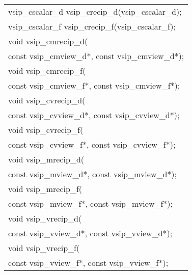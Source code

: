 \\\cvsiplh
\afh
\\\hspace*{.04\textwidth} {
\ttfamily
\begin{tabular}[H]{l}
vsip\_cscalar\_d vsip\_crecip\_d(vsip\_cscalar\_d);\\
vsip\_cscalar\_f vsip\_crecip\_f(vsip\_cscalar\_f);\\
void vsip\_cmrecip\_d(\\*\hspace{.6cm}const vsip\_cmview\_d*, const vsip\_cmview\_d*);\\
void vsip\_cmrecip\_f(\\*\hspace{.6cm}const vsip\_cmview\_f*, const vsip\_cmview\_f*);\\
void vsip\_cvrecip\_d(\\*\hspace{.6cm}const vsip\_cvview\_d*, const vsip\_cvview\_d*);\\
void vsip\_cvrecip\_f(\\*\hspace{.6cm}const vsip\_cvview\_f*, const vsip\_cvview\_f*);\\
void vsip\_mrecip\_d(\\*\hspace{.6cm}const vsip\_mview\_d*, const vsip\_mview\_d*);\\
void vsip\_mrecip\_f(\\*\hspace{.6cm}const vsip\_mview\_f*, const vsip\_mview\_f*);\\
void vsip\_vrecip\_d(\\*\hspace{.6cm}const vsip\_vview\_d*, const vsip\_vview\_d*);\\
void vsip\_vrecip\_f(\\*\hspace{.6cm}const vsip\_vview\_f*, const vsip\_vview\_f*);\\
\end{tabular}
}
\\\pyjvsiph